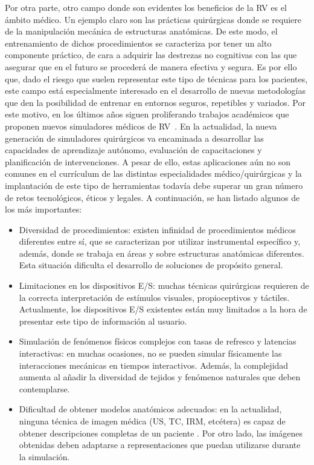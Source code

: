Por otra parte, otro campo donde son evidentes los beneficios de la \ac{RV} es  el ámbito médico. Un ejemplo claro son las prácticas quirúrgicas donde se requiere de la manipulación mecánica de estructuras anatómicas. De este modo, el entrenamiento de dichos procedimientos se caracteriza por tener un alto componente práctico, de cara a adquirir las destrezas no cognitivas con las que asegurar que en el futuro se procederá de manera efectiva y segura.
Es por ello que, dado el riesgo que suelen representar este tipo de técnicas para los pacientes, este campo está especialmente interesado en el desarrollo de nuevas metodologías que den la posibilidad de entrenar en entornos seguros, repetibles y variados. Por este motivo, en los últimos años siguen proliferando trabajos académicos que proponen nuevos simuladores médicos de \ac{RV}~\cite{korzeniowski2018vcsim3,cecil2017advanced}. En la actualidad, la nueva generación de simuladores quirúrgicos va encaminada a desarrollar las capacidades de aprendizaje autónomo, evaluación de capacitaciones y planificación de intervenciones. A pesar de ello, estas aplicaciones aún no son comunes en el currículum de las distintas especialidades médico/quirúrgicas y la implantación de este tipo de herramientas todavía debe superar un gran número de retos tecnológicos, éticos y legales. A continuación, se han listado algunos de los más importantes:
\begin{itemize}
    \item Diversidad de procedimientos: existen infinidad de procedimientos médicos diferentes entre sí, que se caracterizan por utilizar instrumental específico y, además, donde se trabaja en áreas y sobre estructuras anatómicas diferentes. Esta situación dificulta el desarrollo de soluciones de propósito general.
    \item Limitaciones en los dispositivos \ac{E/S}: muchas técnicas quirúrgicas requieren de la correcta interpretación de estímulos visuales, propioceptivos y táctiles. Actualmente, los dispositivos E/S existentes están muy limitados a la hora de presentar este tipo de información al usuario. 
    \item Simulación de fenómenos físicos complejos con tasas de refresco y latencias interactivas: en muchas ocasiones, no se pueden simular físicamente las interacciones mecánicas en tiempos interactivos. Además, la complejidad aumenta al añadir la diversidad de tejidos y fenómenos naturales que deben contemplarse. 
    \item Dificultad de obtener modelos anatómicos adecuados: en la actualidad, ninguna técnica de imagen médica (\ac{US}, \ac{TC}, \ac{IRM}, etcétera) es capaz de obtener descripciones completas de un paciente \cite{mita}. Por otro lado, las imágenes obtenidas deben adaptarse a representaciones que puedan utilizarse durante la simulación.
\end{itemize}
